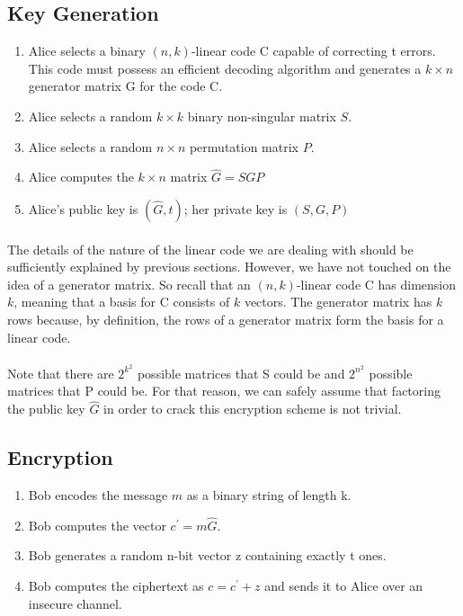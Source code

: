 \documentclass[12pt]{article}
\theoremstyle{definition}
\begin{document}
	\subsection{Key Generation}
	\begin{enumerate}[1)]
		\item Alice selects a binary $(n,k)$-linear code C capable of correcting t errors. This code must possess an efficient decoding algorithm and generates a $k \times n$ generator matrix G for the code C.
		
		\item Alice selects a random $k \times k$ binary non-singular matrix $S$.
		
		\item Alice selects a random $n \times n$ permutation matrix $P$.
		
		\item Alice computes the $k \times n$ matrix ${\hat G} = SGP$
		
		\item Alice's public key is $({\hat G}, t)$; her private key is $(S, G, P)$
	\end{enumerate}	 	

	\paragraph{} The details of the nature of the linear code we are dealing with should be sufficiently explained by previous sections.  However, we have not touched on the idea of a generator matrix.  So recall that an $(n,k)$-linear code C has dimension $k$, meaning that a basis for C consists of $k$ vectors.  The generator matrix has $k$ rows because, by definition, the rows of a generator matrix form the basis for a linear code.  
	\paragraph{} Note that there are $2^{k^2}$ possible matrices that S could be and $2^{n^2}$ possible matrices that P could be.  For that reason, we can safely assume that factoring the public key ${\hat G}$ in order to crack this encryption scheme is not trivial.
	
	\subsection{Encryption}
	\begin{enumerate}[1)]
	\item Bob encodes the message $m$ as a binary string of length k.
	\item Bob computes the vector $c^{\prime} = m{\hat G}$.
	\item Bob generates a random n-bit vector z containing exactly t ones.
	\item Bob computes the ciphertext as $c = c^{\prime} + z$ and sends it to Alice over an insecure channel.  	
	\end{enumerate}	
\end{document}
